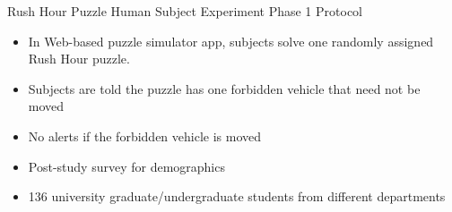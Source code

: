 \begin{frame}{Rush Hour Puzzle Human Subject Experiment Phase 1 Protocol}
\begin{itemize}
\item In Web-based puzzle simulator app, subjects solve one randomly assigned Rush Hour puzzle.
\item Subjects are told the puzzle has one forbidden vehicle that need not be moved
\item No alerts if the forbidden vehicle is moved
\item Post-study survey for demographics
\item 136 university graduate/undergraduate students from different departments
\end{itemize}

\end{frame}